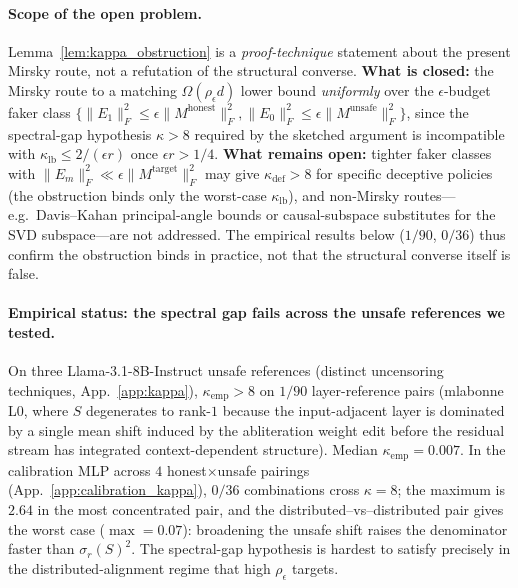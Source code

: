 \documentclass[10pt]{article}
\theoremstyle{definition}
\theoremstyle{remark}
\begin{document}
\paragraph{Scope of the open problem.}
Lemma~\ref{lem:kappa_obstruction} is a
\emph{proof-technique} statement about the present
Mirsky route, not a refutation of the structural
converse.  \textbf{What is closed:} the Mirsky route to
a matching $\Omega(\rho_{\epsilon}d)$ lower bound
\emph{uniformly} over the $\epsilon$-budget faker class
$\{\|E_1\|_F^2 \leq \epsilon\|M^{\mathrm{honest}}\|_F^2,
\|E_0\|_F^2 \leq \epsilon\|M^{\mathrm{unsafe}}\|_F^2\}$,
since the spectral-gap hypothesis $\kappa > 8$ required
by the sketched argument is incompatible with
$\kappa_{\mathrm{lb}} \leq 2/(\epsilon r)$ once
$\epsilon r > 1/4$.  \textbf{What remains open:}
tighter faker classes with $\|E_m\|_F^2 \ll
\epsilon\|M^{\mathrm{target}}\|_F^2$ may give
$\kappa_{\mathrm{def}} > 8$ for specific deceptive
policies (the obstruction binds only the worst-case
$\kappa_{\mathrm{lb}}$), and non-Mirsky routes---e.g.\
Davis--Kahan principal-angle bounds or
causal-subspace substitutes for the SVD subspace---are
not addressed.  The empirical results below ($1/90$,
$0/36$) thus confirm the obstruction binds in practice,
not that the structural converse itself is false.

\paragraph{Empirical status: the spectral gap fails
across the unsafe references we tested.}
On three Llama-3.1-8B-Instruct unsafe references
(distinct uncensoring techniques, App.~\ref{app:kappa}),
$\kappa_{\mathrm{emp}} > 8$ on $1/90$ layer-reference
pairs (mlabonne L$0$, where $S$ degenerates to rank-$1$
because the input-adjacent layer is dominated by a
single mean shift induced by the abliteration weight
edit before the residual stream has integrated
context-dependent structure).
Median $\kappa_{\mathrm{emp}} = 0.007$.  In the
calibration MLP across $4$ honest$\times$unsafe
pairings (App.~\ref{app:calibration_kappa}), $0/36$
combinations cross $\kappa = 8$; the maximum is $2.64$
in the most concentrated pair, and the
distributed--vs--distributed pair gives the worst case
($\max = 0.07$): broadening the unsafe shift raises
the denominator faster than $\sigma_r(S)^2$.  The
spectral-gap hypothesis is hardest to satisfy precisely
in the distributed-alignment regime that high
$\rho_{\epsilon}$ targets.
\end{document}
